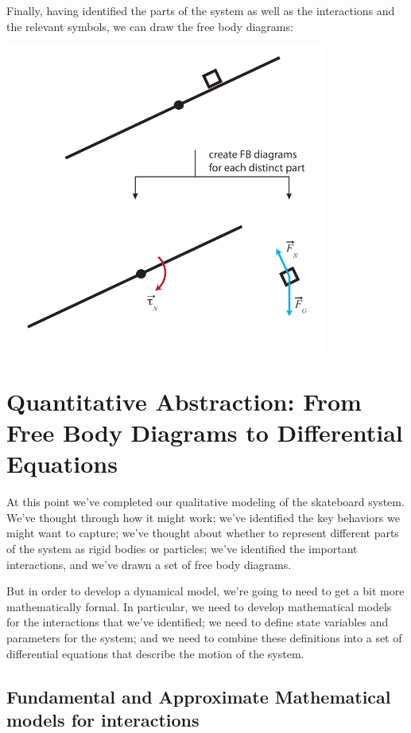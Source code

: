 \documentclass{tufte-handout}
\begin{document}
Finally, having identified the parts of the system as well as the interactions and the relevant symbols, we can draw the free body diagrams:


\includegraphics[height=4in]{figs/skateboardfbds}

\section{Quantitative Abstraction: From Free Body Diagrams to Differential Equations}

At this point we've completed our qualitative modeling of the skateboard system.  We've thought through how it might work; we've identified the key behaviors we might want to capture; we've thought about whether to represent different parts of the system as rigid bodies or particles; we've identified the important interactions, and we've drawn a set of free body diagrams.

But in order to develop a dynamical model, we're going to need to get a bit more mathematically formal.  In particular, we need to develop mathematical models for the interactions that we've identified; we need to define state variables and parameters for the system; and we need to combine these definitions into a set of differential equations that describe the motion of the system. 

\subsection{Fundamental and Approximate Mathematical models for interactions}
\end{document}
